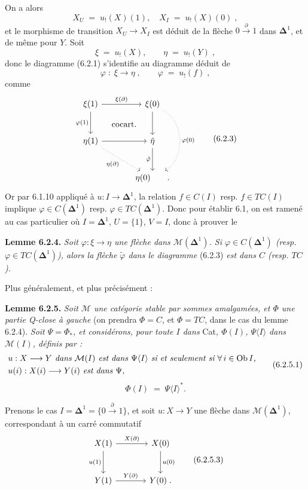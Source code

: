 \documentclass[11pt]{article}
\newcommand{\printedpage}[1]{\marginpar{\footnotesize p.~#1}}
\newcommand{\msp}[1]{\marginpar{\footnotesize [#1]}}
\newcommand{\Ob}{\operatorname{Ob}}
\newcommand{\Dl}{\boldsymbol{\Delta}}
\begin{document}
\msp{page 106}
On a alors
\[
X_U \;=\; u_!(X)(1), \quad X_I \;=\; u_!(X)(0)\;,
\]
et le morphisme de transition $X_U \longrightarrow X_I$ est déduit de la flèche $0 \xrightarrow{\ \partial\ } 1$ dans $\Dl^1$, et de même pour $Y$. Soit
\[
\xi \;=\; u_!(X), \qquad \eta \;=\; u_!(Y)\;,
\]
\printedpage{53}
donc le diagramme (6.2.1) s'identifie au diagramme déduit de
\[
\varphi \;:\; \xi \longrightarrow \eta\;, \qquad \varphi \;=\; u_!(f)\;,
\]
comme
\[
\begin{tikzcd}[row sep=large, column sep=large]
\xi(1) \arrow[r, "\xi(\partial)"] \arrow[d, "\varphi(1)"'] \arrow[dr, phantom, "\text{cocart.}"] & \xi(0) \arrow[d] \arrow[dd, dotted, bend left=60, "\varphi(0)"] \\
\eta(1) \arrow[r] \arrow[dr, dotted, "\eta(\partial)"'] & \tilde{\eta} \arrow[d, "\tilde{\varphi}"'] \\
 & \eta(0) \qquad .
\end{tikzcd}
\tag*{(6.2.3)}
\]
Or par 6.1.10 appliqué à $u : I \longrightarrow \Dl^1$, la relation $f \in C(I)$ resp. $f \in TC(I)$ implique $\varphi \in C(\Dl^1)$ resp. $\varphi \in TC(\Dl^1)$. Donc pour établir 6.1, on est ramené au cas particulier où $I = \Dl^1$, $U = \{1\}$, $V = I$, donc à prouver le

\textbf{Lemme 6.2.4.} \textit{Soit $\varphi : \xi \longrightarrow \eta$ une flèche dans $\mathcal{M}(\Dl^1)$. Si $\varphi \in C(\Dl^1)$ (resp.}
\msp{page 107}
\textit{$\varphi \in TC(\Dl^1)$), alors la flèche $\tilde{\varphi}$ dans le diagramme} (6.2.3) \textit{est dans $C$ (resp. $TC$).}

Plus généralement, et plus précisément :

\textbf{Lemme 6.2.5.} \textit{Soit $\mathcal{M}$ une catégorie stable par sommes amalgamées, et $\Phi$ une partie Q-close à gauche} (on prendra $\Phi = C$, et $\Phi = TC$, dans le cas du lemme 6.2.4). \textit{Soit $\Psi = \Phi_{*}$, et considérons, pour toute $I$ dans} Cat\textit{, $\Phi(I)$, $\Psi\langle I\rangle$ dans $\mathcal{M}(I)$, définis par :}
\[
\begin{aligned}
&\text{\textit{$u : X \longrightarrow Y$ dans $\mathcal{M}(I)$ est dans $\Psi\langle I\rangle$ si et seulement si $\forall\, i \in \Ob I$,}}\\
&\text{\textit{$u(i) : X(i) \longrightarrow Y(i)$ est dans $\Psi$,}}
\end{aligned}
\tag*{(6.2.5.1)}
\]
\[
\Phi(I) \;=\; \Psi\langle I\rangle^{*}.
\tag*{(6.2.5.2)}
\]

Prenons le cas $I = \Dl^1 = \{0 \xrightarrow{\ \partial\ } 1\}$, et soit $u : X \longrightarrow Y$ une flèche dans $\mathcal{M}(\Dl^1)$, correspondant à un carré commutatif
\[
\begin{tikzcd}[row sep=large, column sep=large]
X(1) \arrow[r, "X(\partial)"] \arrow[d, "u(1)"'] & X(0) \arrow[d, "u(0)"] \\
Y(1) \arrow[r, "Y(\partial)"] & Y(0)\;.
\end{tikzcd}
\tag*{(6.2.5.3)}
\]
\end{document}
